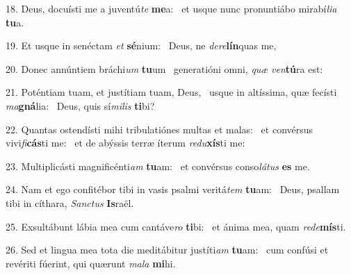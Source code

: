 18. Deus, docuísti me a juventú\textit{te} \textbf{me}a: \ast\  et usque nunc pronuntiábo mirabí\textit{li}\textit{a} \textbf{tu}a.\

19. Et usque in senéctam \textit{et} \textbf{sé}nium: \ast\  Deus, ne \textit{de}\textit{re}\textbf{lín}quas me,\

20. Donec annúntiem bráchi\textit{um} \textbf{tu}um \ast\  generatióni omni, \textit{quæ} \textit{ven}\textbf{tú}ra est:\

21. Poténtiam tuam, et justítiam tuam, Deus, \dag\  usque in altíssima, quæ fecísti \textit{ma}\textbf{gná}lia: \ast\  Deus, quis sí\textit{mi}\textit{lis} \textbf{ti}bi?\

22. Quantas ostendísti mihi tribulatiónes multas et malas: \dag\  et convérsus vivi\textit{fi}\textbf{cás}ti me: \ast\  et de abýssis terræ íterum \textit{re}\textit{du}\textbf{xís}ti me:\

23. Multiplicásti magnificénti\textit{am} \textbf{tu}am: \ast\  et convérsus conso\textit{lá}\textit{tus} \textbf{es} me.\

24. Nam et ego confitébor tibi in vasis psalmi veritá\textit{tem} \textbf{tu}am: \ast\  Deus, psallam tibi in cíthara, \textit{Sanc}\textit{tus} \textbf{Is}raël.\

25. Exsultábunt lábia mea cum cantáve\textit{ro} \textbf{ti}bi: \ast\  et ánima mea, quam \textit{red}\textit{e}\textbf{mís}ti.\

26. Sed et lingua mea tota die meditábitur justíti\textit{am} \textbf{tu}am: \ast\  cum confúsi et revériti fúerint, qui quærunt \textit{ma}\textit{la} \textbf{mi}hi.\

